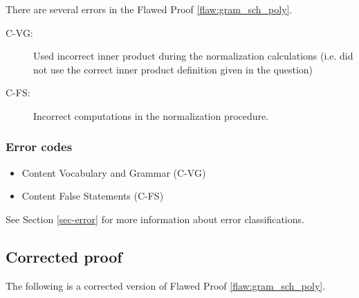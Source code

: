 
There are several errors
 in the Flawed Proof \ref{flaw:gram_sch_poly}. %


 \begin{description}
 	\item[C-VG:] Used incorrect inner product during the normalization calculations (i.e. did not use the correct inner product definition given in the question)
 	\item[C-FS:] Incorrect computations in the normalization procedure.
 \end{description}


\subsubsection{Error codes}
\begin{itemize}
	\item 	Content Vocabulary and Grammar (C-VG)
	\item   Content False Statements (C-FS)
\end{itemize}
See Section \ref{sec-error} for more information about error classifications.

\clearpage
\subsection{Corrected proof}

The following is a corrected version of Flawed Proof \ref{flaw:gram_sch_poly}. %

